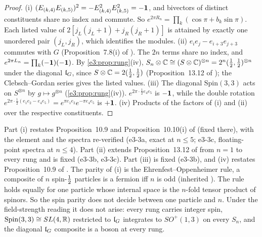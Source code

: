 \begin{proof}
(i) $(E_{(k,4)}E_{(k,5)})^2=-E_{(k,4)}^2E_{(k,5)}^2=-\mathbf 1$, and bivectors of distinct constituents share no index and commute. So
$e^{2\pi R_n}=\prod_k(\cos\pi+b_k\sin\pi)$. Each listed value of $2[j_L(j_L+1)+j_R(j_R+1)]$ is attained by exactly one unordered pair $(j_L,j_R)$, which identifies the
modules. (ii) $e_ie_j-e_{i+3}e_{j+3}$ commutes with $G$ (Proposition~7.8(i) of \cite{RE}). The $2n$ terms share no index, and
$e^{2\pi L_n}=\prod_k(-\mathbf 1)(-\mathbf 1)$. By \cref{e3:prop:rung}(iv), $S_n\otimes\mathbb{C}\cong(S\otimes\mathbb{C})^{\otimes n}=2^n(\tfrac12,\tfrac12)^{\otimes n}$ under the diagonal $\mathfrak l_G$,
since $S\otimes\mathbb{C}=2(\tfrac12,\tfrac12)$ (Proposition~13.12 of \cite{ES17}); the Clebsch--Gordan series gives the listed values. (iii) The diagonal
$\mathrm{Spin}(3,3)$ acts on $S^{\otimes n}$ by $g\mapsto g^{\otimes n}$ (\cref{e3:prop:rung}(iv)). $e^{2\pi\cdot\frac12e_4e_5}$ is $-\mathbf 1$, while the double
rotation $e^{2\pi\cdot\frac12(e_1e_2-e_4e_5)}=e^{\pi e_1e_2}e^{-\pi e_4e_5}$ is $+\mathbf 1$. (iv) Products of the factors of (i) and (ii) over the respective
constituents.
\end{proof}

Part (i) restates Proposition~10.9 and Proposition~10.10(i) of \cite{ES17} (fixed there), with the element and the spectra re-verified (e3-3a,
exact at $n\le5$; e3-3c, floating-point spectra at $n\le4$). Part (ii) extends Proposition~13.12 of \cite{ES17} from $n=1$ to every rung and is
fixed (e3-3b, e3-3c). Part (iii) is fixed (e3-3b), and (iv) restates Proposition~10.9 of \cite{ES17}. The parity of (i) is the
Ehrenfest--Oppenheimer rule, a composite of $n$ spin-$\tfrac12$ particles is a fermion iff $n$ is odd (inherited \cite{EhrenfestOppenheimer31}).
The rule holds equally for one particle whose internal space is the $n$-fold tensor product of spinors. So the spin parity does not decide
between one particle and $n$. Under the field-strength reading it does not arise: every rung carries integer spin, $\mathrm{Spin}(3,3)\cong SL(4,\mathbb{R})$
restricted to $\mathfrak l_G$ integrates to $SO^+(1,3)$ on every $S_n$, and the diagonal $\mathfrak l_G$ composite is a boson at every rung.

